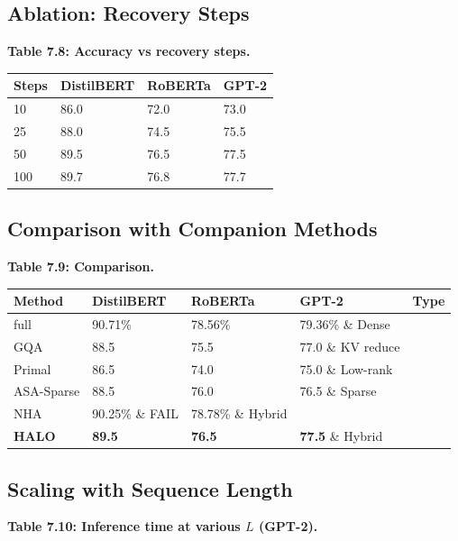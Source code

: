 \subsection{Ablation: Recovery Steps}

\textbf{Table 7.8: Accuracy vs recovery steps.}

\begin{table}[H]
\centering
\small
\begin{tabular}{llll}
\toprule
\textbf{Steps} & \textbf{DistilBERT} & \textbf{RoBERTa} & \textbf{GPT-2} \\
\midrule
10 & 86.0 & 72.0 & 73.0 \\
25 & 88.0 & 74.5 & 75.5 \\
50 & 89.5 & 76.5 & 77.5 \\
100 & 89.7 & 76.8 & 77.7 \\
\bottomrule
\end{tabular}
\end{table}

\subsection{Comparison with Companion Methods}

\textbf{Table 7.9: Comparison.}

\begin{table}[H]
\centering
\small
\begin{tabular}{lllll}
\toprule
\textbf{Method} & \textbf{DistilBERT} & \textbf{RoBERTa} & \textbf{GPT-2} & \textbf{Type} \\
\midrule
full & 90.71\% & 78.56\% & 79.36\% \& Dense \\
GQA & 88.5 & 75.5 & 77.0 \& KV reduce \\
Primal & 86.5 & 74.0 & 75.0 \& Low-rank \\
ASA-Sparse & 88.5 & 76.0 & 76.5 \& Sparse \\
NHA & 90.25\% \& FAIL & 78.78\% \& Hybrid \\
\textbf{HALO} & \textbf{89.5} & \textbf{76.5} & \textbf{77.5} \& Hybrid \\
\bottomrule
\end{tabular}
\end{table}

\subsection{Scaling with Sequence Length}

\textbf{Table 7.10: Inference time at various $L$ (GPT-2).}


